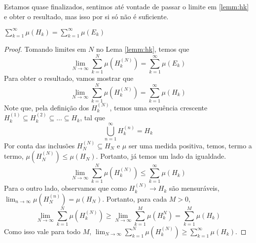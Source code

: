 Estamos quase finalizados, sentimos até vontade de passar o limite em \ref{lemm:hk} e obter o resultado, mas isso por si só não é suficiente.
\begin{prop}
    $\sum_{k=1}^{\infty} \mu(H_k) = \sum_{k=1}^{\infty} \mu(E_k)$
\end{prop}
\begin{proof}
    Tomando limites em $N$ no Lema \ref{lemm:hk}, temos que
    $$\lim_{N \to \infty} \sum_{k=1}^{N} \mu(H_k^{(N)}) = \sum_{k=1}^{\infty} \mu(E_k)$$
    Para obter o resultado, vamos mostrar que
    $$\lim_{N \to \infty} \sum_{k=1}^{N} \mu(H_k^{(N)}) = \sum_{k=1}^{\infty} \mu(H_k)$$
    Note que, pela definição dos $H_k^{(N)}$, temos uma sequência crescente $H_k^{(1)} \subseteq H_k^{(2)} \subseteq \dots \subseteq H_k$, tal que
    $$\bigcup_{n=1}^{\infty} H_k^{(n)} = H_k$$
    Por conta das inclusões $H_N^{(N)} \subseteq H_N$ e $\mu$ ser uma medida positiva, temos, termo a termo,
    $\mu(H_N^{(N)}) \leq \mu(H_N)$. Portanto, já temos um lado da igualdade.
    $$\lim_{N \to \infty} \sum_{k=1}^{N} \mu(H_k^{(N)}) \leq \sum_{k=1}^{\infty} \mu(H_k)$$
    Para o outro lado, observamos que como $H_k^{(N)} \to H_k$ são mensuráveis, $\lim_{n\to\infty} \mu(H_N^{(n)}) = \mu(H_N)$.
    Portanto, para cada $M > 0$, 
    $$\lim_{N \to \infty} \sum_{k=1}^{N} \mu(H_k^{(N)}) \geq \lim_{N \to \infty} \sum_{k=1}^{M} \mu(H_k^{N}) = \sum_{k=1}^{M} \mu(H_k)$$
    Como isso vale para todo $M$, $\lim_{N \to \infty} \sum_{k=1}^{N} \mu(H_k^{(N)}) \geq \sum_{k=1}^{\infty} \mu(H_k)$.
\end{proof}